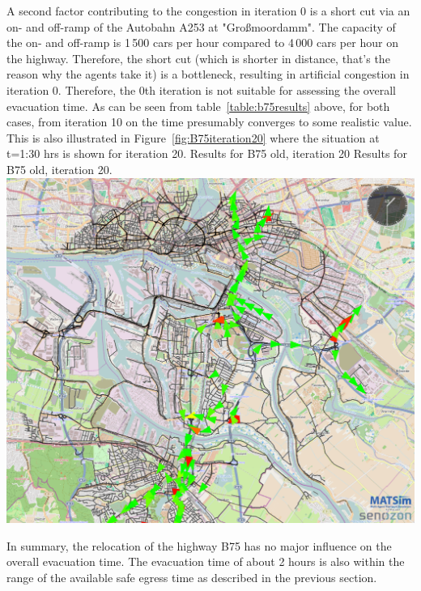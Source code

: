 {}
%
A second factor contributing to the congestion in iteration 0 is a short cut via an on- and off-ramp of the Autobahn A253 at "Gro{\ss}moordamm". The capacity of the on- and off-ramp is 1\,500 cars per hour compared to 4\,000 cars per hour on the highway. Therefore, the short cut (which is shorter in distance, that's the reason why the agents take it) is a bottleneck, resulting in artificial congestion in iteration 0.
Therefore, the 0th iteration is not suitable for assessing the overall evacuation time. As can be seen from table~\ref{table:b75results} above, for both cases, from iteration 10 on the time presumably converges to some realistic value. This is also illustrated in Figure~\ref{fig:B75iteration20} where the situation at t=1:30 hrs is shown for iteration 20.
%
\createfigure%
{Results for B75 old, iteration 20}%
{Results for B75 old, iteration 20.}%
{\label{fig:B75iteration20}}%
{\includegraphics[width=0.7\linewidth]{using/figures/B75iteration20}}%
{}

In summary, the relocation of the highway B75 has no major influence on the overall evacuation time. The evacuation time of about 2 hours is also within the range of the available safe egress time as described in the previous section. 

